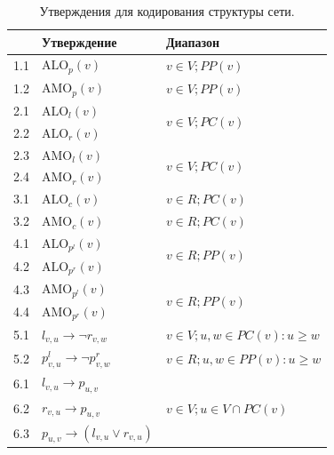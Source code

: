 \begin{table}[t]
\centering
\caption{Утверждения для кодирования структуры сети.}
\begin{tabular}{l | l | l} %
  \qquad & Утверждение & Диапазон \\
  
  \hline
  1.1 &
  $\mathrm{ALO}_p(v)$ &
  $v \in V; PP(v)$
  \\
  1.2 &
  $\mathrm{AMO}_p(v)$ &
  $v \in V; PP(v)$
  \\
  
  \hline
  2.1 &
  $\mathrm{ALO}_l(v)$ &
  \multirow{2}{*}{$v \in V; PC(v)$}
  \\
  2.2 &
  $\mathrm{ALO}_r(v)$ &
  \\
  \hdashline
  
  2.3 &
  $\mathrm{AMO}_l(v)$ &
  \multirow{2}{*}{$v \in V; PC(v)$}
  \\
  2.4 &
  $\mathrm{AMO}_r(v)$ &
  \\
  
  \hline
  3.1 &
  $\mathrm{ALO}_c(v)$ &
  $v \in R; PC(v)$
  \\
  3.2 &
  $\mathrm{AMO}_c(v)$ &
  $v \in R; PC(v)$
  \\
  
  \hline
  4.1 &
  $\mathrm{ALO}_{p^l}(v)$ &
  \multirow{2}{*}{$v \in R; PP(v)$}
  \\
  4.2 &
  $\mathrm{ALO}_{p^r}(v)$ &
  \\
  \hdashline
  
  4.3 &
  $\mathrm{AMO}_{p^l}(v)$ &
  \multirow{2}{*}{$v \in R; PP(v)$}
  \\
  4.4 &
  $\mathrm{AMO}_{p^r}(v)$ &
  \\

  \hline
  5.1 &
  $l_{v,u} \rightarrow \neg r_{v,w}$ &
  $v \in V; u, w \in PC(v): u \geq w$
  \\
  5.2 &
  $p^l_{v,u} \rightarrow \neg p^r_{v,w}$ &
  $v \in R; u, w \in PP(v) : u \geq w$
  \\
  
  \hline
  6.1 &
  $l_{v,u} \rightarrow p_{u,v}$ &
  \multirow{3}{*}{$v \in V; u \in V \cap PC(v)$}
  \\
  6.2 &
  $r_{v,u} \rightarrow p_{u,v}$ &
  \\
  6.3 &
  $p_{u,v} \rightarrow (l_{v,u} \vee r_{v,u})$ &
  \\
  

\end{tabular}
\end{table}
